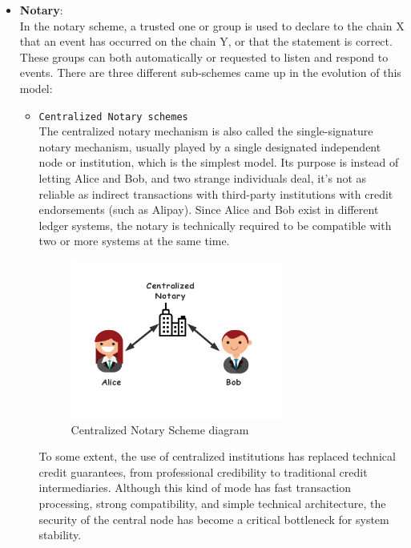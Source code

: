 \begin{itemize}
    \item \textbf{Notary\cite{buterin2016chain}}:\\
    In the notary scheme, a trusted one or group is used to declare to the chain X that an event has occurred on the chain Y, or that the statement is correct. These groups can both automatically or requested to listen and respond to events. There are three different sub-schemes came up in the evolution of this model: 
    \begin{itemize}
        \item \texttt{Centralized Notary schemes}\\
        The centralized notary mechanism is also called the single-signature notary mechanism, usually played by a single designated independent node or institution, which is the simplest model. Its purpose is instead of letting Alice and Bob, and two strange individuals deal, it's not as reliable as indirect transactions with third-party institutions with credit endorsements (such as Alipay). Since Alice and Bob exist in different ledger systems, the notary is technically required to be compatible with two or more systems at the same time.
        \begin{figure}[H]
        \includegraphics[width=0.7\textwidth]{./figures/cnotary.png}
        \centering
        \caption{Centralized Notary Scheme diagram}%
        \centering
        \label{fig:cno}
        \end{figure}
        To some extent, the use of centralized institutions has replaced technical credit guarantees, from professional credibility to traditional credit intermediaries. Although this kind of mode has fast transaction processing, strong compatibility, and simple technical architecture, the security of the central node has become a critical bottleneck for system stability.
        

\end{itemize}
\end{itemize}
